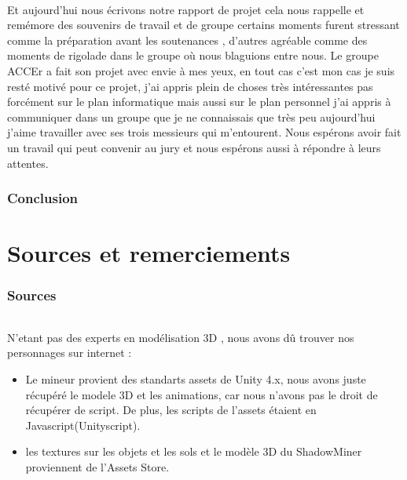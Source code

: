 \documentclass[titlepage, 13px, a4paper]{report}
\begin{document}
\paragraph{} \hspace{0pt}
Et aujourd’hui nous écrivons notre rapport de projet cela nous rappelle et remémore des souvenirs de travail et 
de groupe certains moments furent stressant comme la préparation avant les soutenances
, d’autres agréable comme des moments de rigolade dans le groupe où nous blaguions entre nous. Le groupe 
ACCEr a fait son projet avec envie à mes yeux, en tout cas c’est mon cas je suis resté motivé pour ce projet, 
j’ai appris plein de choses très intéressantes pas forcément sur le plan informatique mais aussi sur le plan 
personnel j’ai appris à communiquer dans un groupe que je ne connaissais que très peu aujourd’hui j’aime 
travailler avec ses trois messieurs qui m’entourent. Nous espérons avoir fait un travail qui peut convenir 
au jury et nous espérons aussi à répondre à leurs attentes. \\


\newpage
\section{Conclusion}
\paragraph{} \hspace{0pt}



\newpage


\part{Sources et remerciements}

\section{Sources}
\paragraph{} \hspace{0pt}
N'etant pas des experts en modélisation 3D , nous avons dû trouver nos personnages sur internet : 
{\begin{itemize}
	\item Le mineur provient des standarts assets de Unity 4.x, nous avons juste récupéré le modele 3D et les animations, 
	car nous n'avons pas le droit de récupérer de script. De plus, les scripts de l'assets étaient en Javascript(Unityscript).
	\item les textures sur les objets et les sols et le modèle 3D du ShadowMiner proviennent de l'Assets Store. \\
\end{itemize}} 
\end{document}
